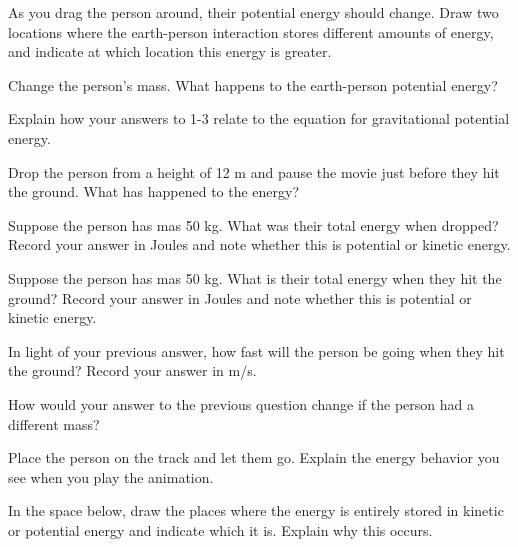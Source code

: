 \documentclass{handout}
\begin{document}
\begin{questions}
    \question As you drag the person around, their potential energy should change. Draw two locations where the earth-person interaction stores different amounts of energy, and indicate at which location this energy is greater.

    \answerspace{1.5in}

    \question Change the person's mass. What happens to the earth-person potential energy?

    \answerspace{1.5in}

    \question Explain how your answers to 1-3 relate to the equation for gravitational potential energy.

    \answerspace{1.5in}

    \question Drop the person from a height of 12 m and pause the movie just before they hit the ground. What has happened to the energy?

    \answerspace{1.5in}

    \question Suppose the person has mas 50 kg. What was their total energy when dropped? Record your answer in Joules and note whether this is potential or kinetic energy.

    \answerspace{1.5in}

    \question Suppose the person has mas 50 kg. What is their total energy when they hit the ground? Record your answer in Joules and note whether this is potential or kinetic energy.

    \answerspace{1.5in}

    \question In light of your previous answer, how fast will the person be going when they hit the ground? Record your answer in m/s.

    \answerspace{1.5in}

    \question How would your answer to the previous question change if the person had a different mass?

    \answerspace{1.5in}

    \question Place the person on the track and let them go. Explain the energy behavior you see when you play the animation.

    \answerspace{1.5in}

    \question In the space below, draw the places where the energy is entirely stored in kinetic or potential energy and indicate which it is. Explain why this occurs.

    \answerspace{1.5in}
\end{questions}
\clearpage
\end{document}
